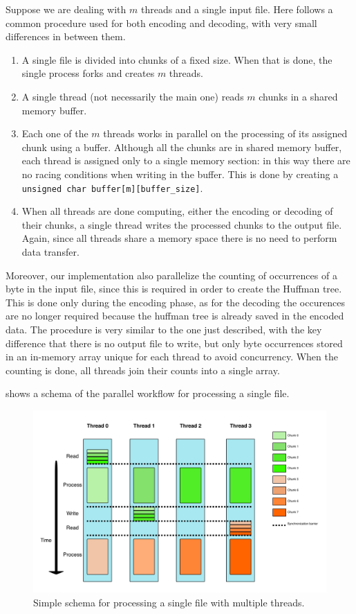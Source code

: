 Suppose we are dealing with \(m\) threads and a single input file. Here follows a common procedure used for both encoding and decoding, with very small differences in between them.
\begin{enumerate}
	\item A single file is divided into chunks of a fixed size. When that is done, the single process forks and creates \(m\) threads.
	\item A single thread (not necessarily the main one) reads \(m\) chunks in a shared memory buffer.
	\item Each one of the \(m\) threads works in parallel on the processing of its assigned chunk using a buffer. Although all the chunks are in shared memory buffer, each thread is assigned only to a single memory section: in this way there are no racing conditions when writing in the buffer. This is done by creating a \verb|unsigned char buffer[m][buffer_size]|. 
	\item When all threads are done computing, either the encoding or decoding of their chunks, a single thread writes the processed chunks to the output file.
	Again, since all threads share a memory space there is no need to perform data transfer.
\end{enumerate}

Moreover, our implementation also parallelize the counting of occurrences of a byte in the input file, since this is required in order to create the Huffman tree. 
This is done only during the encoding phase, as for the decoding the occurences are no longer required because the huffman tree is already saved in the encoded data. The procedure is very similar to the one just described, with the key difference that there is no output file to write, but only byte occurrences stored in an in-memory array unique for each thread to avoid concurrency. When the counting is done, all threads join their counts into a single array.

  shows a schema of the parallel workflow for processing a single file. 

\begin{figure}
	\centering
	\includegraphics[width=0.8\linewidth]{../imgs/threading}
	\caption{Simple schema for processing a single file with multiple threads.}
	\label{fig:threading}
\end{figure}



